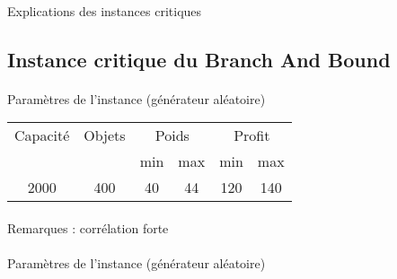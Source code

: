 \documentclass[12pt]{article}
\begin{document}
\paragraph{}Explications des instances critiques

\subsection{Instance critique du Branch And Bound}

\paragraph{}Paramètres de l'instance (générateur aléatoire)

\begin{tabular}{|c|c|c|c|c|c|}
\hline
Capacité & Objets & \multicolumn{2}{c|}{Poids} & \multicolumn{2}{c|}{Profit} \\
\cline{3-6}
& & min & max & min & max \\
\hline
2000 & 400 & 40 & 44 & 120 & 140 \\
\hline
\end{tabular}

\begin{figure}[!h]
\begin{floatrow}
\end{floatrow}
\end{figure}

\paragraph{}Remarques : corrélation forte

\paragraph{}Paramètres de l'instance (générateur aléatoire)
\end{document}
